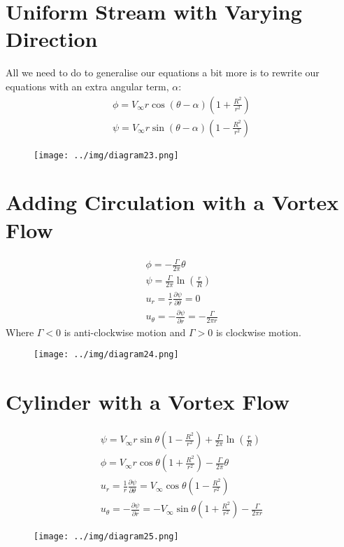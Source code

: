 \documentclass[class=report, crop=false, 12pt,a4paper]{standalone}
\begin{document}
\section{Uniform Stream with Varying Direction}
All we need to do to generalise our equations a bit more is to rewrite our equations with an extra angular term, $\alpha$:
\begin{gather}
  \phi = V_{\infty}r\cos(\theta-\alpha)\left(1+\frac{R^2}{r^2}\right)\\
  \psi = V_{\infty}r\sin(\theta-\alpha)\left(1-\frac{R^2}{r^2}\right)
\end{gather}
\begin{figure}[H]
  \centering
  \texttt{[image: ../img/diagram23.png]}
\end{figure}
\section{Adding Circulation with a Vortex Flow}
\begin{gather}
  \phi = -\frac{\Gamma}{2\pi}\theta\\
  \psi = \frac{\Gamma}{2\pi}\ln\left(\frac{r}{R}\right)\\
  u_r = \frac{1}{r}\frac{\partial \psi}{\partial \theta} = 0\\
  u_{\theta} = -\frac{\partial \psi}{\partial r} = -\frac{\Gamma}{2\pi r}
\end{gather}
Where $\Gamma < 0$ is anti-clockwise motion and $\Gamma > 0$ is clockwise motion.
\begin{figure}[H]
  \centering
  \texttt{[image: ../img/diagram24.png]}
\end{figure}
\section{Cylinder with a Vortex Flow}
\begin{gather}
  \psi = V_{\infty}r\sin\theta\left(1-\frac{R^2}{r^2}\right) + \frac{\Gamma}{2\pi}\ln\left(\frac{r}{R}\right)\\
  \phi = V_{\infty}r\cos\theta\left(1+\frac{R^2}{r^2}\right)-\frac{\Gamma}{2\pi}\theta\\
  u_r = \frac{1}{r}\frac{\partial \psi}{\partial \theta} = V_{\infty}\cos\theta\left(1-\frac{R^2}{r^2}\right)\\
  u_{\theta} = -\frac{\partial \psi}{\partial r} = - V_{\infty}\sin\theta\left(1+\frac{R^2}{r^2}\right)-\frac{\Gamma}{2\pi r}
\end{gather}
\begin{figure}[H]
  \centering
  \texttt{[image: ../img/diagram25.png]}
\end{figure}
\end{document}
